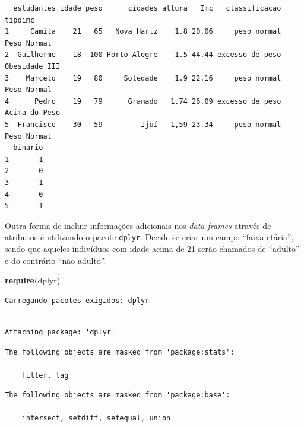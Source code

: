 \documentclass[12pt,brazil,oneside]{book}
\newenvironment{Shaded}{\begin{snugshade}}{\end{snugshade}}
\newcommand{\DecValTok}[1]{\textcolor[rgb]{0.00,0.00,0.81}{#1}}
\newcommand{\KeywordTok}[1]{\textcolor[rgb]{0.13,0.29,0.53}{\textbf{#1}}}
\newcommand{\NormalTok}[1]{#1}
\newcommand{\OperatorTok}[1]{\textcolor[rgb]{0.81,0.36,0.00}{\textbf{#1}}}
\newcommand{\StringTok}[1]{\textcolor[rgb]{0.31,0.60,0.02}{#1}}
\begin{document}
\begin{verbatim}
  estudantes idade peso      cidades altura   Imc   classificacao       tipoimc
1     Camila    21   65   Nova Hartz    1.8 20.06     peso normal   Peso Normal
2  Guilherme    18  100 Porto Alegre    1.5 44.44 excesso de peso Obesidade III
3    Marcelo    19   80     Soledade    1.9 22.16     peso normal   Peso Normal
4      Pedro    19   79      Gramado   1.74 26.09 excesso de peso Acima do Peso
5  Francisco    30   59         Ijuí   1,59 23.34     peso normal   Peso Normal
  binario
1       1
2       0
3       1
4       0
5       1
\end{verbatim}

Outra forma de incluir informações adicionais nos \emph{data frames} através de atributos é utilizando o pacote \texttt{dplyr}. Decide-se criar um campo ``faixa etária'', sendo que aqueles indivíduos com idade acima de 21 serão chamados de ``adulto'' e do contrário ``não adulto''.

\begin{Shaded}
\begin{Highlighting}[]
\KeywordTok{require}\NormalTok{(dplyr)}
\end{Highlighting}
\end{Shaded}

\begin{verbatim}
Carregando pacotes exigidos: dplyr
\end{verbatim}

\begin{verbatim}

Attaching package: 'dplyr'
\end{verbatim}

\begin{verbatim}
The following objects are masked from 'package:stats':

    filter, lag
\end{verbatim}

\begin{verbatim}
The following objects are masked from 'package:base':

    intersect, setdiff, setequal, union
\end{verbatim}

\begin{Shaded}
\end{Shaded}
\end{document}
